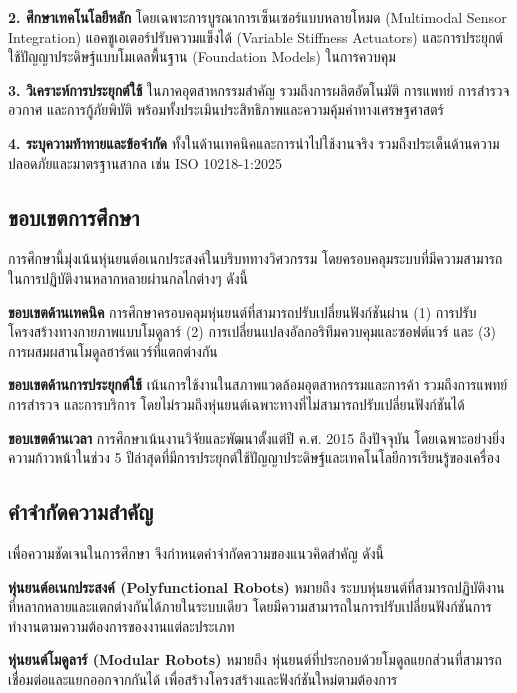 \documentclass[a4paper]{article}
\begin{document}
\textbf{2. ศึกษาเทคโนโลยีหลัก} โดยเฉพาะการบูรณาการเซ็นเซอร์แบบหลายโหมด (Multimodal Sensor Integration) \parencite{yang2024body} แอคชูเอเตอร์ปรับความแข็งได้ (Variable Stiffness Actuators) และการประยุกต์ใช้ปัญญาประดิษฐ์แบบโมเดลพื้นฐาน (Foundation Models) ในการควบคุม

\textbf{3. วิเคราะห์การประยุกต์ใช้} ในภาคอุตสาหกรรมสำคัญ รวมถึงการผลิตอัตโนมัติ การแพทย์ การสำรวจอวกาศ และการกู้ภัยพิบัติ พร้อมทั้งประเมินประสิทธิภาพและความคุ้มค่าทางเศรษฐศาสตร์

\textbf{4. ระบุความท้าทายและข้อจำกัด} ทั้งในด้านเทคนิคและการนำไปใช้งานจริง รวมถึงประเด็นด้านความปลอดภัยและมาตรฐานสากล เช่น ISO 10218-1:2025 \parencite{iso2025robotics}

\subsection{ขอบเขตการศึกษา}

การศึกษานี้มุ่งเน้นหุ่นยนต์อเนกประสงค์ในบริบททางวิศวกรรม โดยครอบคลุมระบบที่มีความสามารถในการปฏิบัติงานหลากหลายผ่านกลไกต่างๆ ดังนี้

\textbf{ขอบเขตด้านเทคนิค} การศึกษาครอบคลุมหุ่นยนต์ที่สามารถปรับเปลี่ยนฟังก์ชันผ่าน (1) การปรับโครงสร้างทางกายภาพแบบโมดูลาร์ (2) การเปลี่ยนแปลงอัลกอริทึมควบคุมและซอฟต์แวร์ และ (3) การผสมผสานโมดูลฮาร์ดแวร์ที่แตกต่างกัน

\textbf{ขอบเขตด้านการประยุกต์ใช้} เน้นการใช้งานในสภาพแวดล้อมอุตสาหกรรมและการค้า รวมถึงการแพทย์ การสำรวจ และการบริการ โดยไม่รวมถึงหุ่นยนต์เฉพาะทางที่ไม่สามารถปรับเปลี่ยนฟังก์ชันได้

\textbf{ขอบเขตด้านเวลา} การศึกษาเน้นงานวิจัยและพัฒนาตั้งแต่ปี ค.ศ. 2015 ถึงปัจจุบัน โดยเฉพาะอย่างยิ่งความก้าวหน้าในช่วง 5 ปีล่าสุดที่มีการประยุกต์ใช้ปัญญาประดิษฐ์และเทคโนโลยีการเรียนรู้ของเครื่อง

\subsection{คำจำกัดความสำคัญ}

เพื่อความชัดเจนในการศึกษา จึงกำหนดคำจำกัดความของแนวคิดสำคัญ ดังนี้

\textbf{หุ่นยนต์อเนกประสงค์ (Polyfunctional Robots)} หมายถึง ระบบหุ่นยนต์ที่สามารถปฏิบัติงานที่หลากหลายและแตกต่างกันได้ภายในระบบเดียว โดยมีความสามารถในการปรับเปลี่ยนฟังก์ชันการทำงานตามความต้องการของงานแต่ละประเภท

\textbf{หุ่นยนต์โมดูลาร์ (Modular Robots)} หมายถึง หุ่นยนต์ที่ประกอบด้วยโมดูลแยกส่วนที่สามารถเชื่อมต่อและแยกออกจากกันได้ เพื่อสร้างโครงสร้างและฟังก์ชันใหม่ตามต้องการ \parencite{bi2016survey}
\end{document}
